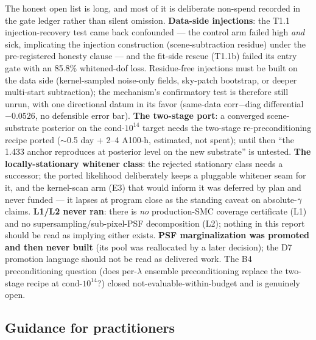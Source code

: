 The honest open list is long, and most of it is deliberate non-spend
recorded in the gate ledger rather than silent omission.
{\bf Data-side injections}: the T1.1 injection-recovery test came back
confounded --- the control arm failed high {\it and} sick, implicating the
injection construction (scene-subtraction residue) under the pre-registered
honesty clause --- and the fit-side rescue (T1.1b) failed its entry gate
with an 85.8\% whitened-dof loss. Residue-free injections must be built on
the data side (kernel-sampled noise-only fields, sky-patch bootstrap, or
deeper multi-start subtraction); the mechanism's confirmatory test is
therefore still unrun, with one directional datum in its favor (same-data
corr$-$diag differential $-0.0526$, no defensible error bar).
{\bf The two-stage port}: a converged scene-substrate posterior on the
cond-$10^{14}$ target needs the two-stage re-preconditioning recipe ported
($\sim$0.5 day + 2--4 A100-h, estimated, not spent); until then ``the 1.433
anchor reproduces at posterior level on the new substrate'' is untested.
{\bf The locally-stationary whitener class}: the rejected stationary class
needs a successor; the ported likelihood deliberately keeps a pluggable
whitener seam for it, and the kernel-scan arm (E3) that would inform it
was deferred by plan and never funded --- it lapses at program close as
the standing caveat on absolute-$\gamma$ claims. {\bf L1/L2 never ran}:
there is {\it no} production-SMC coverage certificate (L1) and no
supersampling/sub-pixel-PSF decomposition (L2); nothing in this report
should be read as implying either exists. {\bf PSF marginalization was
promoted and then never built} (its pool was reallocated by a later
decision); the D7 promotion language should not be read as delivered work.
The B4 preconditioning question (does per-$\lambda$ ensemble
preconditioning replace the two-stage recipe at cond-$10^{14}$?) closed
not-evaluable-within-budget and is genuinely open.

\subsection{Guidance for practitioners}

